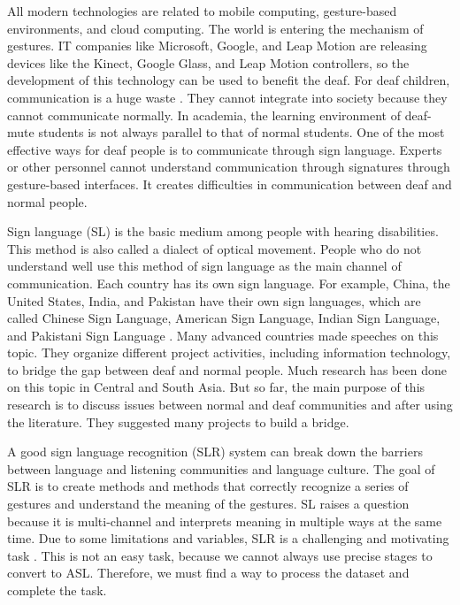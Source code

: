 \documentclass[twocolumn,10pt]{asme2ej}
\begin{document}
All modern technologies are related to mobile computing, gesture-based environments, and cloud computing. The world is entering the mechanism of gestures. IT companies like Microsoft, Google, and Leap Motion are releasing devices like the Kinect, Google Glass, and Leap Motion controllers, so the development of this technology can be used to benefit the deaf. For deaf children, communication is a huge waste \cite{Zafrulla2010AmericanSL}. They cannot integrate into society because they cannot communicate normally. In academia, the learning environment of deaf-mute students is not always parallel to that of normal students. One of the most effective ways for deaf people is to communicate through sign language. Experts or other personnel cannot understand communication through signatures through gesture-based interfaces. It creates difficulties in communication between deaf and normal people.

Sign language (SL) is the basic medium among people with hearing disabilities. This method is also called a dialect of optical movement. People who do not understand well use this method of sign language as the main channel of communication. Each country has its own sign language. For example, China, the United States, India, and Pakistan have their own sign languages, which are called Chinese Sign Language, American Sign Language, Indian Sign Language, and Pakistani Sign Language \cite{li2020wordlevel}. Many advanced countries made speeches on this topic. They organize different project activities, including information technology, to bridge the gap between deaf and normal people. Much research has been done on this topic in Central and South Asia. But so far, the main purpose of this research is to discuss issues between normal and deaf communities and after using the literature. They suggested many projects to build a bridge.

A good sign language recognition (SLR) system can break down the barriers between language and listening communities and language culture. The goal of SLR is to create methods and methods that correctly recognize a series of gestures and understand the meaning of the gestures. SL raises a question because it is multi-channel and interprets meaning in multiple ways at the same time. Due to some limitations and variables, SLR is a challenging and motivating task \cite{DBLP}. This is not an easy task, because we cannot always use precise stages to convert to ASL. Therefore, we must find a way to process the dataset and complete the task.
\end{document}
